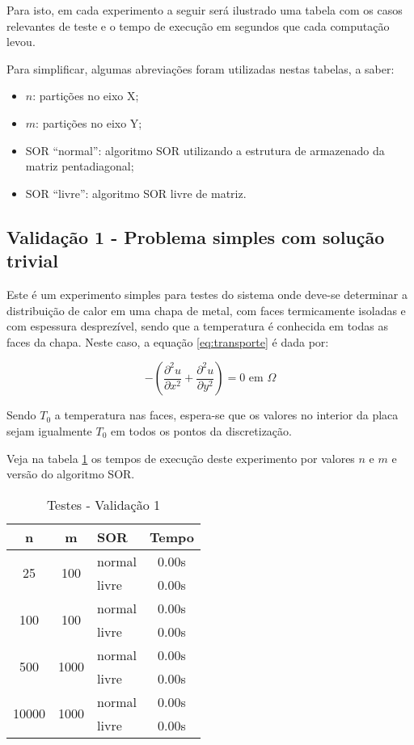 \documentclass[
	11pt,				%
	oneside,			%
	a4paper,			%
	english,			%
	brazil,				%
	]{article}
\begin{document}
Para isto, em cada experimento a seguir será ilustrado uma
tabela com os casos relevantes de teste e o tempo de
execução em segundos que cada computação levou.

Para simplificar, algumas abreviações foram utilizadas nestas
tabelas, a saber:
\begin{itemize}
 \item $n$: partições no eixo X;
 \item $m$: partições no eixo Y;
 \item SOR ``normal'': algoritmo SOR utilizando a estrutura de
 armazenado da matriz pentadiagonal;
 \item SOR ``livre'': algoritmo SOR livre de matriz.
\end{itemize}


\subsection{Validação 1 - Problema simples com solução trivial}
Este é um experimento simples para testes do sistema onde
deve-se determinar a distribuição de calor em uma chapa de
metal, com faces termicamente isoladas e com espessura
desprezível, sendo que a temperatura é conhecida em todas
as faces da chapa. Neste caso, a equação \eqref{eq:transporte}
é dada por:

\begin{equation} \label{eq:v1}
- \left(\frac{\partial^2 u}{\partial x^2} + \frac{\partial^2 u}{\partial 
y^2}\right) = 0 \text{ em } \Omega
\end{equation}

Sendo $T_0$ a temperatura nas faces, espera-se que os valores
no interior da placa sejam igualmente $T_0$ em todos os pontos
da discretização.

Veja na tabela \ref{tab:tv1} os tempos de execução deste experimento
por valores $n$ e $m$ e versão do algoritmo SOR.

\begin{table}[ht]
\centering
\begin{tabular}{|c|c|l|c|}
\hline 
\textbf{n} & \textbf{m} & \textbf{SOR} & \textbf{Tempo} \\
\hline
\multirow{2}{*}{25}    & \multirow{2}{*}{100}  & normal & 0.00s \\
                       &                       & livre  & 0.00s \\
\hline
\multirow{2}{*}{100}   & \multirow{2}{*}{100}  & normal & 0.00s \\
                       &                       & livre  & 0.00s \\
\hline
\multirow{2}{*}{500}   & \multirow{2}{*}{1000} & normal & 0.00s \\
                       &                       & livre  & 0.00s \\
\hline
\multirow{2}{*}{10000} & \multirow{2}{*}{1000} & normal & 0.00s \\
                       &                       & livre  & 0.00s \\
\hline
\end{tabular}
\caption{Testes - Validação 1}
\label{tab:tv1}
\end{table}
\end{document}
